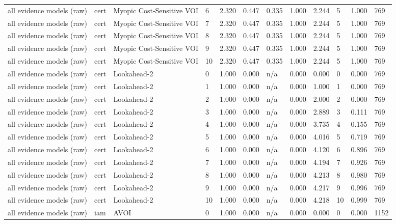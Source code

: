 \begin{table}[!ht]
{\begin{tabular}{llllllllllll}
all evidence models (raw) & cert & Myopic Cost-Sensitive VOI & 6 & 2.320 & 0.447 & 0.335 & 1.000 & 2.244 & 5 & 1.000 & 769 \\
all evidence models (raw) & cert & Myopic Cost-Sensitive VOI & 7 & 2.320 & 0.447 & 0.335 & 1.000 & 2.244 & 5 & 1.000 & 769 \\
all evidence models (raw) & cert & Myopic Cost-Sensitive VOI & 8 & 2.320 & 0.447 & 0.335 & 1.000 & 2.244 & 5 & 1.000 & 769 \\
all evidence models (raw) & cert & Myopic Cost-Sensitive VOI & 9 & 2.320 & 0.447 & 0.335 & 1.000 & 2.244 & 5 & 1.000 & 769 \\
all evidence models (raw) & cert & Myopic Cost-Sensitive VOI & 10 & 2.320 & 0.447 & 0.335 & 1.000 & 2.244 & 5 & 1.000 & 769 \\
all evidence models (raw) & cert & Lookahead-2 & 0 & 1.000 & 0.000 & n/a & 0.000 & 0.000 & 0 & 0.000 & 769 \\
all evidence models (raw) & cert & Lookahead-2 & 1 & 1.000 & 0.000 & n/a & 0.000 & 1.000 & 1 & 0.000 & 769 \\
all evidence models (raw) & cert & Lookahead-2 & 2 & 1.000 & 0.000 & n/a & 0.000 & 2.000 & 2 & 0.000 & 769 \\
all evidence models (raw) & cert & Lookahead-2 & 3 & 1.000 & 0.000 & n/a & 0.000 & 2.889 & 3 & 0.111 & 769 \\
all evidence models (raw) & cert & Lookahead-2 & 4 & 1.000 & 0.000 & n/a & 0.000 & 3.735 & 4 & 0.155 & 769 \\
all evidence models (raw) & cert & Lookahead-2 & 5 & 1.000 & 0.000 & n/a & 0.000 & 4.016 & 5 & 0.719 & 769 \\
all evidence models (raw) & cert & Lookahead-2 & 6 & 1.000 & 0.000 & n/a & 0.000 & 4.120 & 6 & 0.896 & 769 \\
all evidence models (raw) & cert & Lookahead-2 & 7 & 1.000 & 0.000 & n/a & 0.000 & 4.194 & 7 & 0.926 & 769 \\
all evidence models (raw) & cert & Lookahead-2 & 8 & 1.000 & 0.000 & n/a & 0.000 & 4.213 & 8 & 0.980 & 769 \\
all evidence models (raw) & cert & Lookahead-2 & 9 & 1.000 & 0.000 & n/a & 0.000 & 4.217 & 9 & 0.996 & 769 \\
all evidence models (raw) & cert & Lookahead-2 & 10 & 1.000 & 0.000 & n/a & 0.000 & 4.218 & 10 & 0.999 & 769 \\
all evidence models (raw) & iam & AVOI & 0 & 1.000 & 0.000 & n/a & 0.000 & 0.000 & 0 & 0.000 & 1152 \\

\end{tabular}}
\end{table}
